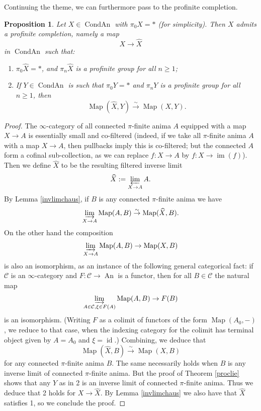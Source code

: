 \documentclass[12pt]{article}
\newtheorem{proposition}[theorem]{Proposition}
\theoremstyle{definition}
\newcommand{\on}{\operatorname}
\newcommand{\mc}{\mathcal}
\newcommand{\wh}{\widehat}
\begin{document}
Continuing the theme, we can furthermore pass to the profinite completion.

\begin{proposition}\label{profcomp}
Let $X\in\on{CondAn}$ with $\pi_0X=\ast$ (for simplicity).  Then $X$ admits a profinite completion, namely a map
$$X\to \wh{X}$$
in $\on{CondAn}$ such that:
\begin{enumerate}
\item $\pi_0\wh{X}=\ast$, and $\pi_n\wh{X}$ is a profinite group for all $n\geq 1$;
\item If $Y\in\on{CondAn}$ is such that $\pi_0Y=\ast$ and $\pi_nY$ is a profinite group for all $n\geq 1$, then
$$\on{Map}(\wh{X},Y)\overset{\sim}{\rightarrow}\on{Map}(X,Y).$$
\end{enumerate}
\end{proposition}
\begin{proof}
The $\infty$-category of all connected $\pi$-finite anima $A$ equipped with a map $X\to A$ is essentially small and co-filtered (indeed, if we take all $\pi$-finite anima $A$ with a map $X\to A$, then pullbacks imply this is co-filtered; but the connected $A$ form a cofinal sub-collection, as we can replace $f:X\to A$ by $f:X\to\on{im}(f)$).  Then we define $\wh{X}$ to be the resulting filtered inverse limit
$$\wh{X} := \varprojlim_{X\to A} A.$$
By Lemma \ref{invlimchaus}, if $B$ is any connected $\pi$-finite anima we have
$$\varinjlim_{X\to A} \on{Map}(A,B)\overset{\sim}{\rightarrow} \on{Map}(\wh{X},B).$$
On the other hand the composition
$$\varinjlim_{X\to A}\on{Map}(A,B) \to \on{Map}(X,B)$$
is also an isomorphism, as an instance of the following general categorical fact: if $\mc{C}$ is an $\infty$-category and $F:\mc{C}\to\on{An}$ is a functor, then for all $B\in\mc{C}$ the natural map
$$\varinjlim_{A\in\mc{C},\xi\in F(A)}\on{Map}(A,B)\to F(B)$$
is an isomorphism.  (Writing $F$ as a colimit of functors of the form $\on{Map}(A_0,-)$, we reduce to that case, when the indexing category for the colimit has terminal object given by $A=A_0$ and $\xi=\on{id}$.)  Combining, we deduce that
$$\on{Map}(\wh{X},B)\overset{\sim}{\rightarrow}\on{Map}(X,B)$$
for any connected $\pi$-finite anima $B$.  The same necessarily holds when $B$ is any inverse limit of connected $\pi$-finite anima.  But the proof of Theorem \ref{proclie} shows that any $Y$ as in 2 is an inverse limit of connected $\pi$-finite anima.  Thus we deduce that 2 holds for $X\to\wh{X}$.  By Lemma \ref{invlimchaus} we also have that $\wh{X}$ satisfies 1, so we conclude the proof.
\end{proof}
\end{document}
